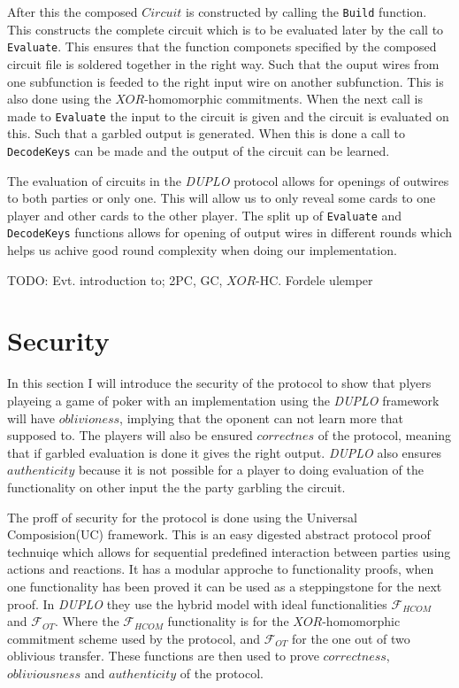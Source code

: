 \documentclass[twoside,11pt,openright]{report}
\newcommand{\todo}[1]{}
\renewcommand{\todo}[1]{{\color{red} TODO: {#1}} \\}
\newcommand{\DUPLO}{\textit{DUPLO} }
\begin{document}
After this the composed $Circuit$ is constructed by calling the \verb|Build| function. This constructs the complete circuit which is to be evaluated later by the call to \verb|Evaluate|. This ensures that the function componets specified by the composed circuit file is soldered together in the right way. Such that the ouput wires from one subfunction is feeded to the right input wire on another subfunction. This is also done using the $XOR$-homomorphic commitments. When the next call is made to \verb|Evaluate| the input to the circuit is given and the circuit is evaluated on this. Such that a garbled output is generated. When this is done a call to \verb|DecodeKeys| can be made and the output of the circuit can be learned.

\bigskip

The evaluation of circuits in the \DUPLO protocol allows for openings of outwires to both parties or only one. This will allow us to only reveal some cards to one player and other cards to the other player. The split up of \verb|Evaluate| and \verb|DecodeKeys| functions allows for opening of output wires in different rounds which helps us achive good round complexity when doing our implementation.


\todo{Evt. introduction to; 2PC, GC, $XOR$-HC. Fordele ulemper}

\section{Security}
\label{sec:duplo_secutity}
In this section I will introduce the security of the protocol to show that plyers playeing a game of poker with an implementation using the \DUPLO framework will have $oblivioness$, implying that the oponent can not learn more that supposed to. The players will also be ensured $correctnes$ of the protocol, meaning that if garbled evaluation is done it gives the right output. \DUPLO also ensures $authenticity$ because it is not possible for a player to doing evaluation of the functionality on other input the the party garbling the circuit.

\bigskip

The proff of security for the protocol is done using the Universal Composision(UC) framework. This is an easy digested abstract protocol proof technuiqe which allows for sequential predefined interaction between parties using actions and reactions. It has a modular approche to functionality proofs, when one functionality has been proved it can be used as a steppingstone for the next proof. In \DUPLO they use the hybrid model with ideal functionalities $\mathcal{F}_{HCOM}$ and $\mathcal{F}_{OT}$. Where the $\mathcal{F}_{HCOM}$ functionality is for the $XOR$-homomorphic commitment scheme used by the protocol, and $\mathcal{F}_{OT}$ for the one out of two oblivious transfer. These functions are then used to prove $correctness$, $obliviousness$ and $authenticity$ of the protocol. 
\end{document}
